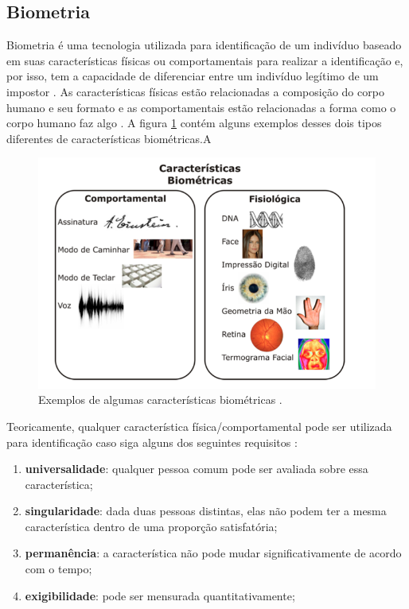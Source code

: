 \subsection{Biometria}
\label{sec:biometria}
	Biometria é uma tecnologia utilizada para identificação de um indivíduo baseado
	em suas características físicas ou comportamentais para realizar a identificação
	e, por isso, tem a capacidade de diferenciar entre um indivíduo legítimo de um
	impostor \cite{hong}. As características físicas estão relacionadas a composição
	do corpo humano e seu formato e as comportamentais estão relacionadas a forma
	como o corpo humano faz algo \cite{drovetto}. A figura
	\ref{caracteristicasBiometricas} contém alguns exemplos desses dois tipos
	diferentes de características biométricas.A

	\begin{figure}[H]
		\begin{center}
			\includegraphics[scale=0.5]{figuras/2.FundamentacaoTeorica/caracteristicasBiometricas.png}
		\end{center}
		\caption{Exemplos de algumas características biométricas \cite{drovetto}.}
		\label{caracteristicasBiometricas}
	\end{figure}


	Teoricamente, qualquer característica física/comportamental pode ser utilizada
	para identificação caso siga alguns dos seguintes requisitos \cite{milene}:

	\begin{enumerate}
		\item \textbf{universalidade}: qualquer pessoa comum pode ser avaliada sobre essa característica;
		\item \textbf{singularidade}: dada duas pessoas distintas, elas não podem ter a mesma característica dentro de uma proporção satisfatória;
		\item \textbf{permanência}: a característica não pode mudar significativamente de acordo com o tempo;
		\item \textbf{exigibilidade}: pode ser mensurada quantitativamente;
	\end{enumerate}

